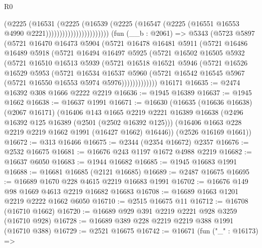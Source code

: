 \begin{lexlean}{R0}
\begin{coremodule}
                                  (@2225
                                    (@16531
                                      (@2225
                                        (@16539
                                          (@2225
                                            (@16547
                                              (@2225
                                                (@16551 @16553 @4990 @2221)))))))))))))))))))))))
    (fun (__b : @2061) =>
    @5343
      (@5723
        @5897
        (@5721
          @16470
          @16473
          @5904
          (@5721
            @16478
            @16481
            @5911
            (@5721
              @16486
              @16489
              @5918
              (@5721
                @16494
                @16497
                @5925
                (@5721
                  @16502
                  @16505
                  @5932
                  (@5721
                    @16510
                    @16513
                    @5939
                    (@5721
                      @16518
                      @16521
                      @5946
                      (@5721
                        @16526
                        @16529
                        @5953
                        (@5721
                          @16534
                          @16537
                          @5960
                          (@5721 @16542 @16545 @5967 (@5721 @16550 @16553 @5974 @5976)))))))))))))
    @16171
@16635 := @2474 @16392 @308 @1666 @2222 @2219
@16636 := @1945 @16389
@16637 := @1945 @1662
@16638 := @16637 @1991
@16671 := @16630
    (@16635
      (@16636 @16638)
      (@2067 @16171)
      (@16406
        @143
        @1665
        @2219
        @2221
        @16389
        @16638
        (@2496 @16392 @125 @16389 (@2501 (@2502 @16392 @125)))
        (@16406 @1663 @228 @2219 @2219 @1662 @1991 (@16427 @1662) @16446))
      (@2526 @16169 @1661))
@16672 := @313 @16466
@16675 := @2344 (@2354 @16672) @2357
@16676 := @2532 @16675
@16681 := @16676 @243 @1197 @1672 @4988 @2219
@16682 := @16637 @6050
@16683 := @1944 @16682
@16685 := @1945 @16683 @1991
@16688 := @16681 @16685 (@2121 @16685)
@16689 := @2487 @16675
@16695 := @16689 @1670 @228 @4615 @2219 @16683 @1991
@16702 := @16676 @149 @98 @1669 @4613 @2219 @16682 @16683
@16708 := @16689 @1663 @1201 @2219 @2222 @1662 @6050
@16710 := @2515 @16675 @11
@16712 := @16708 (@16710 @1662)
@16720 := @16689 @929 @391 @2219 @2221 @928 @3259 (@16710 @928)
@16728 := @16689 @389 @228 @2219 @2219 @388 @1991 (@16710 @388)
@16729 := @2521 @16675
@16742 := @16671
    (fun ("_" : @16173) =>

\end{coremodule}
\end{lexlean}
